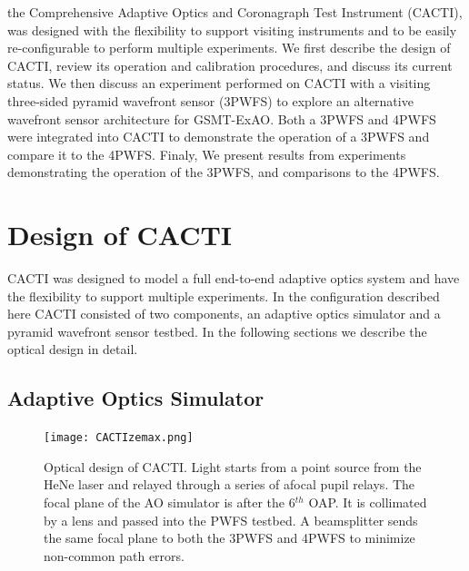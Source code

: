 the Comprehensive Adaptive Optics and Coronagraph Test Instrument (CACTI), was designed with the flexibility to support visiting instruments and to be easily re-configurable to perform multiple experiments. We first describe the design of CACTI, review its operation and calibration procedures, and discuss its current status. We then discuss an experiment performed on CACTI with a visiting three-sided pyramid wavefront sensor (3PWFS) to explore an alternative wavefront sensor architecture for GSMT-ExAO. Both a 3PWFS and 4PWFS were integrated into  CACTI to demonstrate the operation of a 3PWFS and compare it to the 4PWFS. Finaly, We present results from experiments demonstrating the operation of the 3PWFS, and comparisons to the 4PWFS.

\section{Design of CACTI}
CACTI was designed to model a full end-to-end adaptive optics system and have the flexibility to support multiple experiments. In the configuration described here CACTI consisted of two components, an adaptive optics simulator and a pyramid wavefront sensor testbed. In the following sections we describe the optical design in detail. 


\subsection{Adaptive Optics Simulator}

\begin{figure}
    \centering
    \texttt{[image: CACTIzemax.png]}
    \caption{Optical design of CACTI. Light starts from a point source from the HeNe laser and relayed through a series of afocal pupil relays. The focal plane of the AO simulator is after the 6${^{th}}$ OAP. It is collimated by a lens and passed into the PWFS testbed. A beamsplitter sends the same focal plane to both the 3PWFS and 4PWFS to minimize non-common path errors.}
    \label{fig:CACTIZemax}
\end{figure}

